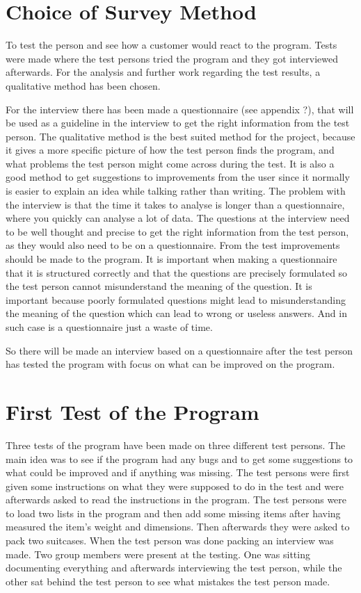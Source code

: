 \section{Choice of Survey Method}
To test the person and see how a customer would react to the program. Tests were made where the test persons tried the program and they got interviewed afterwards. For the analysis and further work regarding the test results, a qualitative method has been chosen.

For the interview there has been made a questionnaire (see appendix ?), that will be used as a guideline in the interview to get the right information from the test person. The qualitative method is the best suited method for the project, because it gives a more specific picture of how the test person finds the program, and what problems the test person might come across during the test. It is also a good method to get suggestions to improvements from the user since it normally is easier to explain an idea while talking rather than writing. The problem with the interview is that the time it takes to analyse is longer than a questionnaire, where you quickly can analyse a lot of data. The questions at the interview need to be well thought and precise to get the right information from the test person, as they would also need to be on a questionnaire. From the test improvements should be made to the program. 
It is important when making a questionnaire that it is structured correctly and that the questions are precisely formulated so the test person cannot misunderstand the meaning of the question. It is important because poorly formulated questions might lead to misunderstanding the meaning of the question which can lead to wrong or useless answers. And in such case is a questionnaire just a waste of time.

So there will be made an interview based on a questionnaire after the test person has tested the program with focus on what can be improved on the program.

\section{First Test of the Program}
Three tests of the program have been made on three different test persons. The main idea was to see if the program had any bugs and to get some suggestions to what could be improved and if anything was missing. The test persons were first given some instructions on what they were supposed to do in the test and were afterwards asked to read the instructions in the program. The test persons were to load two lists in the program and then add some missing items after having measured the item's weight and dimensions. Then afterwards they were asked to pack two suitcases. When the test person was done packing an interview was made. Two group members were present at the testing. One was sitting documenting everything and afterwards interviewing the test person, while the other sat behind the test person to see what mistakes the test person made.

